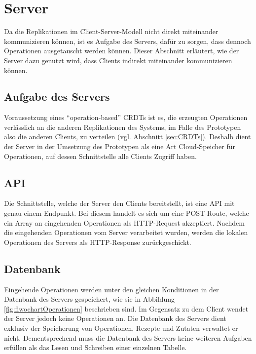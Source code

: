 \documentclass[a4paper, 12pt]{scrreprt}
\begin{document}
\section{Server}

Da die Replikationen im Client-Server-Modell nicht direkt miteinander kommunizieren können, ist es Aufgabe des Servers, dafür zu sorgen, dass dennoch Operationen ausgetauscht werden können. Dieser Abschnitt erläutert, wie der Server dazu genutzt wird, dass Clients indirekt miteinander kommunizieren können. 

\subsection{Aufgabe des Servers}
\label{sec:AufgabeServer}

Voraussetzung eines \enquote{operation-based} \acp{CRDT} ist es, die erzeugten Operationen verlässlich an die anderen Replikationen des Systems, im Falle des Prototypen also die anderen Clients, zu verteilen (vgl. Abschnitt \ref{sec:CRDTs}). Deshalb dient der Server in der Umsetzung des Prototypen als eine Art Cloud-Speicher für Operationen, auf dessen Schnittstelle alle Clients Zugriff haben. 

\subsection{API}

Die Schnittstelle, welche der Server den Clients bereitstellt, ist eine API mit genau einem Endpunkt. Bei diesem handelt es sich um eine POST-Route, welche ein Array an eingehenden Operationen als HTTP-Request akzeptiert. Nachdem die eingehenden Operationen vom Server verarbeitet wurden, werden die lokalen Operationen des Servers als HTTP-Response zurückgeschickt. 

\subsection{Datenbank}

Eingehende Operationen werden unter den gleichen Konditionen in der Datenbank des Servers gespeichert, wie sie in Abbildung \ref{fig:flwochartOperationen} beschrieben sind. Im Gegensatz zu dem Client wendet der Server jedoch keine Operationen an. Die Datenbank des Servers dient exklusiv der Speicherung von Operationen, Rezepte und Zutaten verwaltet er nicht. Dementsprechend muss die Datenbank des Servers keine weiteren Aufgaben erfüllen als das Lesen und Schreiben einer einzelnen Tabelle. 
\end{document}
